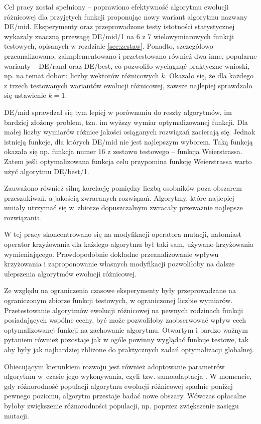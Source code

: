 \documentclass[a4paper,onecolumn,oneside,12pt,wide,floatssmall]{mwrep}
\theoremstyle{definition}
\theoremstyle{plain}%
\theoremstyle{remark}
\begin{document}
Cel pracy został spełniony -- poprawiono efektywność algorytmu ewolucji różnicowej dla przyjętych funkcji
proponując nowy wariant algorytmu nazwany DE/mid. Eksperymenty oraz przeprowadzone testy istotności 
statystycznej wykazały znaczną przewagę DE/mid/1 na 6 z 7 
wielowymiarowych funkcji testowych, opisanych w rozdziale \ref{sec:zestaw}. 
Ponadto, szczegółowo przeanalizowano, zaimplementowano 
i przetestowano również dwa inne, popularne warianty -- DE/rand oraz DE/best, co pozwoliło wyciągnąć 
praktyczne wnioski, np. na temat doboru liczby wektorów różnicowych $k$.
Okazało się, że dla każdego z trzech testowanych wariantów ewolucji różnicowej, zawsze
najlepiej sprawdzało się ustawienie $k = 1$.

DE/mid sprawdzał się tym lepiej w porównaniu do reszty algorytmów, im bardziej
złożony problem, tzn. im wyższy wymiar optymalizowanej funkcji. Dla małej liczby wymiarów
różnice jakości osiąganych rozwiązań zacierają się. Jednak istnieją funkcje, dla których DE/mid nie jest najlepszym wyborem. Taką funkcją okazała się np.
funkcja numer 16 z zestawu testowego -- funkcja Weierstrassa. Zatem jeśli optymalizowana funkcja celu
przypomina funkcję Weierstrassa warto użyć algorytmu DE/best/1.

Zauważono również silną korelację pomiędzy liczbą osobników poza obszarem przeszukiwań,
a jakością zwracanych rozwiązań. Algorytmy, które najlepiej umiały utrzymać się w~zbiorze 
dopuszczalnym zwracały przeważnie najlepsze rozwiązania. 


W tej pracy skoncentrowano się na modyfikacji operatora mutacji, natomiast operator krzyżowania
dla każdego algorytmu był taki sam, używano krzyżowania wymieniającego. Prawdopodobnie dokładne
przeanalizowanie wpływu krzyżowania i zaproponowanie własnych modyfikacji 
pozwoliłoby na dalsze ulepszenia algorytmów ewolucji różnicowej. 

Ze względu na ograniczenia czasowe eksperymenty były przeprowadzane na ograniczonym zbiorze
funkcji testowych, w ograniczonej liczbie wymiarów. Przetestowanie algorytmów ewolucji
różnicowej na pewnych rodzinach funkcji posiadających wspólne cechy, być może pozwoliłoby
zaobserwować wpływ cech optymalizowanej funkcji na zachowanie algorytmu. 
Otwartym i bardzo ważnym pytaniem również pozostaje jak w ogóle powinny wyglądać funkcje testowe, 
tak aby były jak najbardziej zbliżone do praktycznych zadań
optymalizacji globalnej.

Obiecującym kierunkiem rozwoju jest również adoptowanie parametrów algorytmu w~czasie
jego wykonywania, czyli tzw. samoadaptacja \cite{brest}. W momencie, gdy różnorodność populacji
algorytmu ewolucji różnicowej spadnie poniżej pewnego poziomu, algorytm przestaje badać nowe obszary.
Wówczas opłacalne byłoby zwiększenie różnorodności populacji, np. poprzez zwiększenie zasięgu mutacji.
\end{document}
